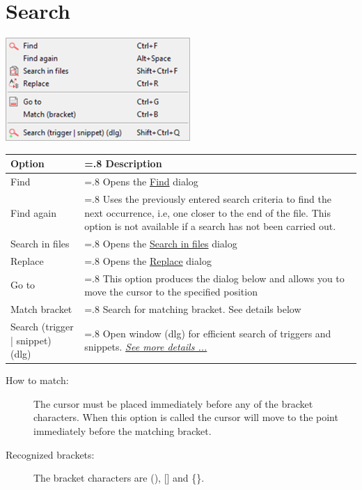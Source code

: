 
\hypertarget{menu_search}{}
\section{Search}

\includegraphics[scale=0.50]{./res/menu_search.png}\\

\begin{scriptsize}
  \begin{tabularx}{\textwidth}{>{\hsize=0.2\hsize}X>{\hsize=.8\hsize}X}\\
    \hline
    \textbf{Option} & \textbf{Description} \\
    \hline
    Find & Opens the \href{\#working\_find\_replace}{Find} dialog \\
    Find again & Uses the previously entered search criteria to find the next occurrence,
    i.e, one closer to the end of the file. This option is not available if a search has not been carried out. \\
    Search in files & Opens the \href{\#working\_search\_in\_files}{Search in files} dialog \\
    \hdashline[1pt/1pt]
    Replace & Opens the \href{\#working\_find\_replace}{Replace} dialog \\
    Go to & This option produces the dialog below and allows you to move the cursor to the specified position \\
    Match bracket & Search for matching bracket. See details below \\
    \hdashline[1pt/1pt]
    Search (trigger | snippet) (dlg) & Open window (dlg) for efficient search of triggers and snippets.
    \textit{\href{\#additional_dialogs_search_trigger}{See more details ...}} \\
    \hline
  \end{tabularx}
\end{scriptsize}

\begin{description}
  \item[How to match:]
    The cursor must be placed immediately before any of the bracket characters.
     When this option is called the cursor will move to the point immediately before the matching bracket.

  \item[Recognized brackets:]
    The bracket characters are (), [] and \{\}.
\end{description}
